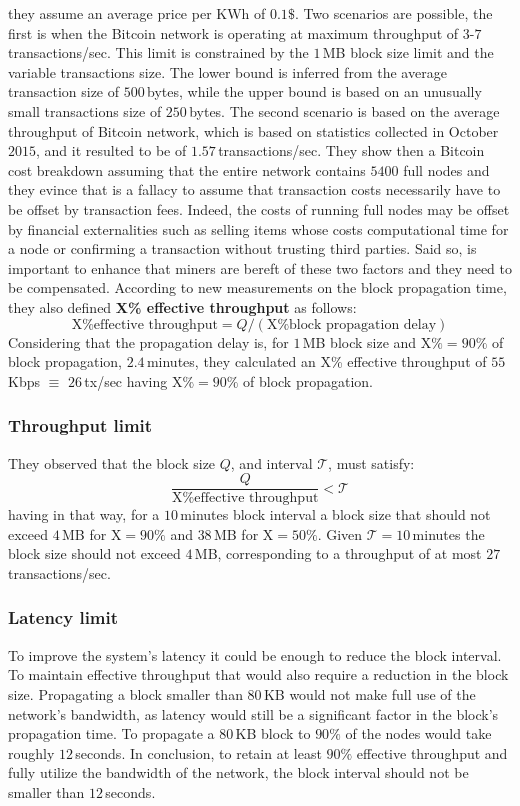 \documentclass[USenglish]{uit-thesis}
\begin{document}
they assume an average price per KWh of $0.1\$$. Two scenarios are
possible, the first is when the Bitcoin network is operating at
maximum throughput of $3$-$7$\,transactions/sec. This
limit is constrained by the $1$\,MB block size limit and the
variable transactions size. The lower bound is inferred
from the average transaction size of $500$\,bytes, while the
upper bound is based on an unusually small transactions
size of $250$\,bytes. The second scenario is based on the
average throughput of Bitcoin network, which is based on
statistics collected in October $2015$, and it resulted to be
of $1.57$\,transactions/sec. They show then a Bitcoin cost
breakdown assuming that the entire network contains
$5400$ full nodes and they evince that is a fallacy to assume
that transaction costs necessarily have to be offset by
transaction fees. Indeed, the costs of running full nodes
may be offset by financial externalities such as selling items
whose costs computational time for a node or confirming a
transaction without trusting third parties. Said so, is important
to enhance that miners are bereft of these two factors and
they need to be compensated. According to new measurements
on the block propagation time, they also defined \textbf{X\% effective
throughput} as follows:
\[
\text{X\% effective throughput} = Q / (\text{X\% block propagation delay})
\]
Considering that the propagation delay is, for $1$\,MB block size and
$\text{X}\% = 90\%$ of block propagation, $2.4$\,minutes, they calculated
an X\% effective throughput of $55$\,Kbps $\equiv$ $26$\,tx/sec
having  $\text{X}\% = 90\%$ of block propagation.
\subsubsection{Throughput limit}
They observed that the block size $Q$, and interval $\mathcal{T}$,
must satisfy:
\[
\frac{Q}{\text{X\% effective throughput}} < \mathcal{T}
\]
having in that way, for a $10$\,minutes block interval a block size
that should not exceed $4$\,MB for $\text{X}=90\%$ and $38$\,MB for
$\text{X}=50\%$. Given $\mathcal{T} = 10$\,minutes the block size
should not exceed $4$\,MB, corresponding to a throughput
of at most $27$\,transactions/sec.
\subsubsection{Latency limit}
To improve the system's latency it could be enough
to reduce the block interval. To maintain effective
throughput that would also require a reduction in the
block size. Propagating a block smaller than $80$\,KB would
not make full use of the network's bandwidth, as latency would
still be a significant factor in the block's propagation time.
To propagate a $80$\,KB block to $90\%$ of the nodes would
take roughly $12$\,seconds. In conclusion, to retain at least $90\%$
effective throughput and fully utilize the bandwidth of the network,
the block interval should not be smaller than $12$\,seconds.
\end{document}
